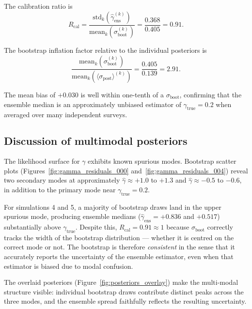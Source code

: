 \documentclass[11pt,a4paper]{article}
\begin{document}
The calibration ratio is
\begin{equation}
  \boxed{R_\mathrm{cal}
  = \frac{\mathrm{std}_k(\hat\gamma_\mathrm{ens}^{(k)})}
         {\mathrm{mean}_k(\sigma_\mathrm{boot}^{(k)})}
  = \frac{0.368}{0.405} = 0.91.}
  \label{eq:rcal_result}
\end{equation}

The bootstrap inflation factor relative to the individual posteriors is
\begin{equation}
  \frac{\mathrm{mean}_k(\sigma_\mathrm{boot}^{(k)})}
       {\mathrm{mean}_k(\langle\sigma_\mathrm{post}\rangle^{(k)})}
  = \frac{0.405}{0.139} = 2.91.
  \label{eq:inflation}
\end{equation}

The mean bias of $+0.030$ is well within one-tenth of a $\sigma_\mathrm{boot}$,
confirming that the ensemble median is an approximately unbiased estimator of
$\gamma_\mathrm{true} = 0.2$ when averaged over many independent surveys.

\subsection{Discussion of multimodal posteriors}
\label{sec:multimodal}

The likelihood surface for $\gamma$ exhibits known spurious modes.  Bootstrap
scatter plots (Figures~\ref{fig:gamma_residuals_000} and~\ref{fig:gamma_residuals_004})
reveal two secondary modes at approximately $\hat\gamma \approx +1.0$ to $+1.3$
and $\hat\gamma \approx -0.5$ to $-0.6$, in addition to the primary mode near
$\gamma_\mathrm{true} = 0.2$.

For simulations 4 and 5, a majority of bootstrap draws land in the upper
spurious mode, producing ensemble medians ($\hat\gamma_\mathrm{ens} = +0.836$
and $+0.517$) substantially above $\gamma_\mathrm{true}$.  Despite this,
$R_\mathrm{cal} = 0.91 \approx 1$ because $\sigma_\mathrm{boot}$ correctly
tracks the width of the bootstrap distribution --- whether it is centred on
the correct mode or not.  The bootstrap is therefore \emph{consistent} in the
sense that it accurately reports the uncertainty of the ensemble estimator, even
when that estimator is biased due to modal confusion.

The overlaid posteriors (Figure~\ref{fig:posteriors_overlay}) make the
multi-modal structure visible: individual bootstrap draws contribute distinct
peaks across the three modes, and the ensemble spread faithfully reflects the
resulting uncertainty.
\end{document}
